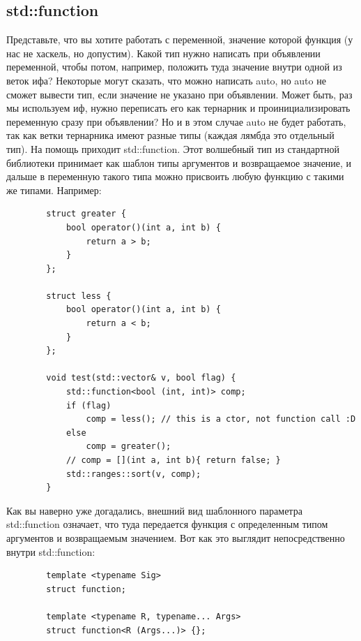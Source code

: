 \documentclass[12pt, a4paper]{article}
\begin{document}
	\subsection{std::function}
	Представьте, что вы хотите работать с переменной, значение которой функция (у нас не хаскель, но допустим). Какой тип нужно написать при объявлении переменной, чтобы потом, например, положить туда значение внутри одной из веток ифа? Некоторые могут сказать, что можно написать auto, но auto не сможет вывести тип, если значение не указано при объявлении. Может быть, раз мы используем иф, нужно переписать его как тернарник и проинициализировать переменную сразу при объявлении? Но и в этом случае auto не будет работать, так как ветки тернарника имеют разные типы (каждая лямбда это отдельный тип). На помощь приходит std::function. Этот волшебный тип из стандартной библиотеки принимает как шаблон типы аргументов и возвращаемое значение, и дальше в переменную такого типа можно присвоить любую функцию с такими же типами. Например:
	\begin{verbatim}
		struct greater {
			bool operator()(int a, int b) {
				return a > b;
			}
		};
		
		struct less {
			bool operator()(int a, int b) {
				return a < b;
			}
		};
		
		void test(std::vector& v, bool flag) {
			std::function<bool (int, int)> comp;
			if (flag)
				comp = less(); // this is a ctor, not function call :D
			else
				comp = greater();
			// comp = [](int a, int b){ return false; }
			std::ranges::sort(v, comp);
		}
	\end{verbatim}
	Как вы наверно уже догадались, внешний вид шаблонного параметра std::function означает, что туда передается функция с определенным типом аргументов и возвращаемым значением. Вот как это выглядит непосредственно внутри std::function:
	\begin{verbatim}
		template <typename Sig>
		struct function;
		
		template <typename R, typename... Args>
		struct function<R (Args...)> {};
	\end{verbatim}
\end{document}
